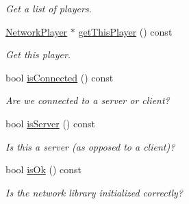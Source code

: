\begin{DoxyCompactItemize}
\begin{DoxyCompactList}\small\item\em \-Get a list of players. \end{DoxyCompactList}\item 
\hypertarget{classNetwork_a5e24715b385b3102eca387e89da60f85}{
\hyperlink{structNetworkPlayer}{\-Network\-Player} $\ast$ \hyperlink{classNetwork_a5e24715b385b3102eca387e89da60f85}{get\-This\-Player} () const }
\label{d5/d16/classNetwork_a5e24715b385b3102eca387e89da60f85}

\begin{DoxyCompactList}\small\item\em \-Get this player. \end{DoxyCompactList}\item 
\hypertarget{classNetwork_a913ef79a8af4c3459707d78db4799b83}{
bool \hyperlink{classNetwork_a913ef79a8af4c3459707d78db4799b83}{is\-Connected} () const }
\label{d5/d16/classNetwork_a913ef79a8af4c3459707d78db4799b83}

\begin{DoxyCompactList}\small\item\em \-Are we connected to a server or client? \end{DoxyCompactList}\item 
\hypertarget{classNetwork_a5c210cee6b83cb8fa8d40964eb83a823}{
bool \hyperlink{classNetwork_a5c210cee6b83cb8fa8d40964eb83a823}{is\-Server} () const }
\label{d5/d16/classNetwork_a5c210cee6b83cb8fa8d40964eb83a823}

\begin{DoxyCompactList}\small\item\em \-Is this a server (as opposed to a client)? \end{DoxyCompactList}\item 
\hypertarget{classNetwork_a48a2e060dbc8de0dca6ec1d48ffd2028}{
bool \hyperlink{classNetwork_a48a2e060dbc8de0dca6ec1d48ffd2028}{is\-Ok} () const }
\label{d5/d16/classNetwork_a48a2e060dbc8de0dca6ec1d48ffd2028}

\begin{DoxyCompactList}\small\item\em \-Is the network library initialized correctly? \end{DoxyCompactList}\end{DoxyCompactItemize}

